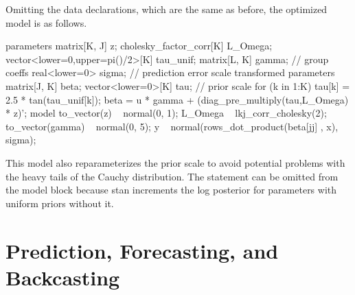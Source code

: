 Omitting the data declarations, which are the same as before, the
optimized model is as follows.
%
\begin{stancode}
parameters {
  matrix[K, J] z;
  cholesky_factor_corr[K] L_Omega;  
  vector<lower=0,upper=pi()/2>[K] tau_unif;  
  matrix[L, K] gamma;                         // group coeffs
  real<lower=0> sigma;                       // prediction error scale
}
transformed parameters {
  matrix[J, K] beta;
  vector<lower=0>[K] tau;     // prior scale
  for (k in 1:K) tau[k] = 2.5 * tan(tau_unif[k]);
  beta = u * gamma + (diag_pre_multiply(tau,L_Omega) * z)';
}
model {
  to_vector(z) ~ normal(0, 1); 
  L_Omega ~ lkj_corr_cholesky(2);
  to_vector(gamma) ~ normal(0, 5);
  y ~ normal(rows_dot_product(beta[jj] , x), sigma);
}
\end{stancode}

This model also reparameterizes the prior scale  to avoid potential problems with the heavy tails of the Cauchy distribution. The statement  can be omitted from the model block because stan increments the log posterior for parameters with uniform priors without it.




\section{Prediction, Forecasting, and Backcasting}

